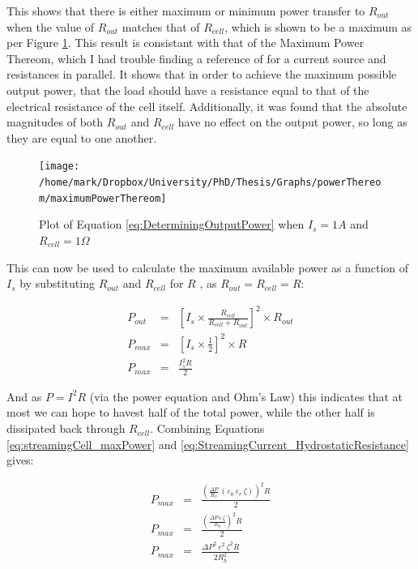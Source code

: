 This shows that there is either maximum or minimum power transfer
to $R_{out}$ when the value of $R_{out}$ matches that of $R_{cell}$,
which is shown to be a maximum as per Figure \ref{fig:Plot-of-PowerThereom}.
This result is consistant with that of the Maximum Power Thereom,
which I had trouble finding a reference of for a current source and
resistances in parallel. It shows that in order to achieve the maximum
possible output power, that the load should have a resistance equal
to that of the electrical resistance of the cell itself. Additionally,
it was found that the absolute magnitudes of both $R_{out}$ and $R_{cell}$
have no effect on the output power, so long as they are equal to one
another.

\begin{figure}
\begin{centering}
\texttt{[image: /home/mark/Dropbox/University/PhD/Thesis/Graphs/powerThereom/maximumPowerThereom]}
\par\end{centering}

\protect\caption{\label{fig:Plot-of-PowerThereom}Plot of Equation \ref{eq:DeterminingOutputPower}
when $I_{s}=1A$ and $R_{cell}=1\Omega$}
\end{figure}


This can now be used to calculate the maximum available power as a
function of $I_{s}$ by substituting $R_{out}$ and $R_{cell}$ for
$R$ , as $R_{out}=R_{cell}=R$:

\begin{eqnarray}
P_{out} & = & \left[I_{s}\times\frac{R_{cell}}{R_{cell}+R_{out}}\right]^{2}\times R_{out}\nonumber \\
P_{max} & = & \left[I_{s}\times\frac{1}{2}\right]^{2}\times R\nonumber \\
P_{max} & = & \frac{I_{s}^{2}R}{2}\label{eq:streamingCell_maxPower}
\end{eqnarray}


And as $P=I^{2}R$ (via the power equation and Ohm's Law) this indicates
that at most we can hope to havest half of the total power, while
the other half is dissipated back through $R_{cell}$. Combining Equations
\ref{eq:streamingCell_maxPower} and \ref{eq:StreamingCurrent_HydrostaticResistance}
gives:

\begin{eqnarray*}
P_{max} & = & \frac{\left(\frac{\Delta P}{R_{h}}\,\left(\varepsilon_{0}\,\varepsilon_{r}\,\zeta\right)\right)^{2}R}{2}\\
P_{max} & = & \frac{\left(\frac{\Delta P\,\varepsilon\,\zeta}{R_{h}}\right)^{2}R}{2}\\
P_{max} & = & \frac{\Delta P^{2}\,\varepsilon^{2}\,\zeta^{2}R}{2R_{h}^{2}}
\end{eqnarray*}



